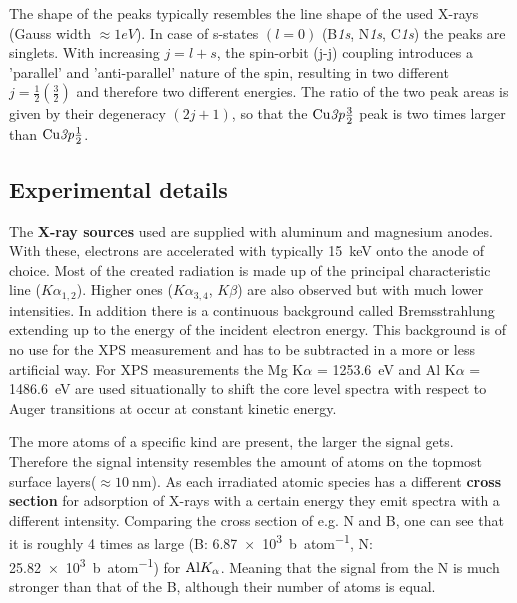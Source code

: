The shape of the peaks typically resembles the line shape of the used X-rays (Gauss width $\approx 1eV$). In case of s-states $(l=0)$ (B\textit{1s}, N\textit{1s}, C\textit{1s}) the peaks are singlets. With increasing $j=l+s$, the spin-orbit (j-j) coupling introduces a 'parallel' and 'anti-parallel' nature of the spin, resulting in two different $j=\frac{1}{2}(\frac{3}{2})$ and therefore two different energies.
The ratio of the two peak areas is given by their degeneracy $(2j+1)$\cite[113]{Riviere_90}, so that the $\textnormal{Cu}\textit{3p}\frac{3}{2}$ peak is two times larger than $\textnormal{Cu}\textit{3p}\frac{1}{2}$.

\subsection{Experimental details}
The \textbf{X-ray sources} used are supplied with aluminum and magnesium anodes.
With these, electrons are accelerated with typically \SI{15}{\keV} onto the anode of choice. Most of the created radiation is made up of the principal characteristic line ($K\alpha_{1,2}$). Higher ones ($K\alpha_{3,4}$, $K\beta$) are also observed but with much lower intensities. In addition there is a continuous background called Bremsstrahlung extending up to the energy of the incident electron energy. This background is of no use for the XPS measurement and has to be subtracted in a more or less artificial way. For XPS measurements the Mg K$\alpha$ = \SI{1253.6}{\eV} and Al K$\alpha$ = \SI{1486.6}{\eV} are used situationally to shift the core level spectra with respect to Auger transitions at occur at constant kinetic energy.

The more atoms of a specific kind are present, the larger the signal gets. Therefore the signal intensity resembles the amount of atoms on the topmost surface layers($\approx \SI{10}{\nm}$). As each irradiated atomic species has a different \textbf{cross section} for adsorption of X-rays with a certain energy they emit spectra with a different intensity. Comparing the cross section of e.g. N and B, one can see that it is roughly 4 times as large (B: \SI{6,87e3}{\barn\per atom}, N: \SI{25,82e3}{\barn\per atom}) for $\textnormal{Al} K_{\alpha}$\cite{henke_x-ray_1993}. Meaning that the signal from the N is much stronger than that of the B, although their number of atoms is equal.


